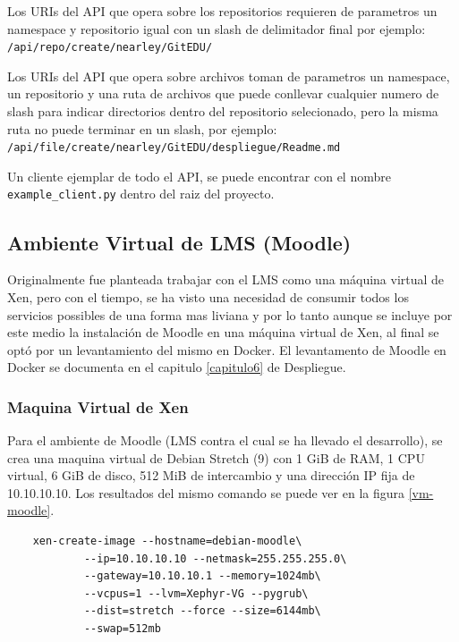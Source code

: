 Los URIs del API que opera sobre los repositorios requieren de parametros un namespace y repositorio igual con un slash de delimitador final por ejemplo: \\
\texttt{/api/repo/create/nearley/GitEDU/}

Los URIs del API que opera sobre archivos toman de parametros un namespace, un repositorio y una ruta de archivos que puede conllevar cualquier numero de slash para indicar directorios dentro del repositorio selecionado, pero la misma ruta no puede terminar en un slash, por ejemplo: \\
\texttt{/api/file/create/nearley/GitEDU/despliegue/Readme.md}

Un cliente ejemplar de todo el API, se puede encontrar con el nombre \\
\texttt{example\_client.py} dentro del raiz del proyecto.

 
\subsection{Ambiente Virtual de LMS  (Moodle)}
\label{instalacion-moodle}
Originalmente fue planteada trabajar con el LMS como una máquina virtual de Xen, pero con el tiempo, se ha visto una necesidad de consumir todos los servicios possibles de una forma mas liviana y por lo tanto aunque se incluye por este medio la instalación de Moodle en una máquina virtual de Xen, al final se optó por un levantamiento del mismo en Docker. El levantamento de Moodle en Docker se documenta en el capitulo \ref{capitulo6} de Despliegue.

\subsubsection{Maquina Virtual de Xen}
Para el ambiente de Moodle (LMS  contra el cual se ha llevado el desarrollo), se crea una maquina virtual de Debian Stretch (9) con 1 GiB de RAM, 1 CPU virtual, 6 GiB de disco, 512 MiB de intercambio y una dirección IP fija de 10.10.10.10. Los resultados del mismo comando se puede ver en la figura \ref{vm-moodle}.
\begin{lstlisting}
	xen-create-image --hostname=debian-moodle\
    		--ip=10.10.10.10 --netmask=255.255.255.0\
        	--gateway=10.10.10.1 --memory=1024mb\
        	--vcpus=1 --lvm=Xephyr-VG --pygrub\
        	--dist=stretch --force --size=6144mb\
        	--swap=512mb
\end{lstlisting}

